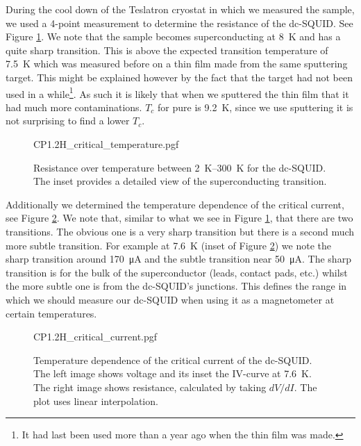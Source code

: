 During the cool down of the Teslatron cryostat in which we measured the sample, we used a 4-point measurement to determine the resistance of the dc-SQUID. See Figure \ref{fig:CP1.1H-SQUID-RT}. We note that the sample becomes superconducting at \qty{8}{\kelvin} and has a quite sharp transition. This is above the expected transition temperature of \qty{7.5}{\kelvin} which was measured before on a thin film made from the same sputtering target. This might be explained however by the fact that the  target had not been used in a while\footnote{It had last been used more than a year ago when the thin film was made.}. As such it is likely that when we sputtered the thin film that it had much more contaminations. $T_c$ for pure  is \qty{9.2}{\kelvin}\cite{maxfieldSuperconductingPenetrationDepth1965}, since we use sputtering it is not surprising to find a lower $T_c$.

\begin{figure}[h]
	\centering
	{CP1.2H_critical_temperature.pgf}
	\caption{Resistance over temperature between \qtyrange{2}{300}{\kelvin} for the dc-SQUID. The inset provides a detailed view of the superconducting transition.}
	\label{fig:CP1.1H-SQUID-RT}
\end{figure}

Additionally we determined the temperature dependence of the critical current, see Figure \ref{fig:CP1.1H-SQUID-critical-current-temperature-dependence}. We note that, similar to what we see in Figure \ref{fig:CP1.1H-SQUID-RT}, that there are two transitions. The obvious one is a very sharp transition but there is a second much more subtle transition. For example at \qty{7.6}{\kelvin} (inset of Figure \ref{fig:CP1.1H-SQUID-critical-current-temperature-dependence}) we note the sharp transition around \qty{170}{\micro\ampere} and the subtle transition near \qty{50}{\micro\ampere}. The sharp transition is for the bulk of the superconductor (leads, contact pads, etc.) whilst the more subtle one is from the dc-SQUID's junctions. This defines the range in which we should measure our dc-SQUID when using it as a magnetometer at certain temperatures.

\begin{figure}[h]
	\centering
	{CP1.2H_critical_current.pgf}
	\caption{Temperature dependence of the critical current of the dc-SQUID. The left image shows voltage and its inset the IV-curve at \qty{7.6}{\kelvin}. The right image shows resistance, calculated by taking $dV/dI$. The plot uses linear interpolation.}
	\label{fig:CP1.1H-SQUID-critical-current-temperature-dependence}
\end{figure}

